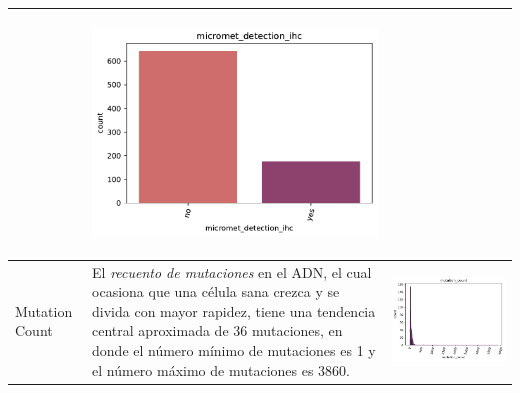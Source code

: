 \begin{table}[!htb]
\begin{threeparttable}
\begin{tabular}{p{2.5cm} p{7.5cm} p{6.5cm}}
			& \begin{center}\includegraphics[width=1\linewidth]{NOTEBOOK/IMAGENES_DESCRIPTIVAS/28_micromet_detection_ihc}\end{center}
			\\ \hline
			
			Mutation Count
			& El \textit{recuento de mutaciones} en el ADN, el cual ocasiona que una célula sana crezca y se divida con mayor rapidez, tiene una tendencia central aproximada de 36 mutaciones, en donde el número mínimo de mutaciones es 1 y el número máximo de mutaciones es 3860.
			& \begin{center}\includegraphics[width=1\linewidth]{NOTEBOOK/IMAGENES_DESCRIPTIVAS/29_mutation_count}\end{center}
			\\ \hline
		\end{tabular}
	\end{threeparttable}
\end{table}

